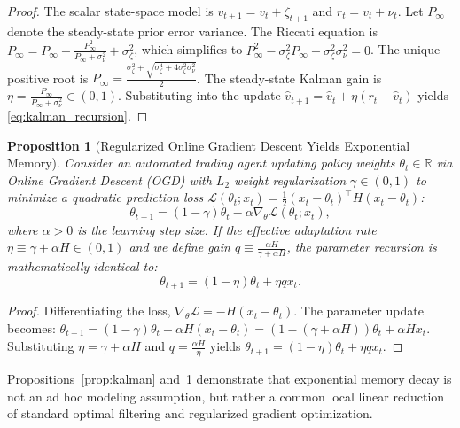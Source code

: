 \documentclass[12pt]{article}
\newtheorem{proposition}[theorem]{Proposition}
\theoremstyle{definition}
\theoremstyle{remark}
\newcommand{\R}{\mathbb{R}}
\begin{document}
\begin{proof}
The scalar state-space model is $v_{t+1} = v_t + \zeta_{t+1}$ and $r_t = v_t + \nu_t$. Let $P_{\infty}$ denote the steady-state prior error variance. The Riccati equation is $P_\infty = P_\infty - \frac{P_\infty^2}{P_\infty + \sigma_\nu^2} + \sigma_\zeta^2$, which simplifies to $P_\infty^2 - \sigma_\zeta^2 P_\infty - \sigma_\zeta^2 \sigma_\nu^2 = 0$. The unique positive root is $P_\infty = \frac{\sigma_\zeta^2 + \sqrt{\sigma_\zeta^4 + 4\sigma_\zeta^2 \sigma_\nu^2}}{2}$. The steady-state Kalman gain is $\eta = \frac{P_\infty}{P_\infty + \sigma_\nu^2} \in (0, 1)$. Substituting into the update $\hat{v}_{t+1} = \hat{v}_t + \eta (r_t - \hat{v}_t)$ yields \eqref{eq:kalman_recursion}.
\end{proof}

\begin{proposition}[Regularized Online Gradient Descent Yields Exponential Memory]
\label{prop:ogd}
Consider an automated trading agent updating policy weights $\theta_t \in \R$ via Online Gradient Descent (OGD) with $L_2$ weight regularization $\gamma \in (0, 1)$ to minimize a quadratic prediction loss $\mathcal{L}(\theta_t; x_t) = \frac{1}{2} (x_t - \theta_t)^\top H (x_t - \theta_t)$:
\begin{equation}
\theta_{t+1} = (1 - \gamma) \theta_t - \alpha \nabla_\theta \mathcal{L}(\theta_t; x_t),
\end{equation}
where $\alpha > 0$ is the learning step size. If the effective adaptation rate $\eta \equiv \gamma + \alpha H \in (0, 1)$ and we define gain $q \equiv \frac{\alpha H}{\gamma + \alpha H}$, the parameter recursion is mathematically identical to:
\begin{equation}
\theta_{t+1} = (1 - \eta) \theta_t + \eta q x_t.
\end{equation}
\end{proposition}

\begin{proof}
Differentiating the loss, $\nabla_\theta \mathcal{L} = -H(x_t - \theta_t)$. The parameter update becomes:
$\theta_{t+1} = (1 - \gamma)\theta_t + \alpha H (x_t - \theta_t) = (1 - (\gamma + \alpha H))\theta_t + \alpha H x_t$.
Substituting $\eta = \gamma + \alpha H$ and $q = \frac{\alpha H}{\eta}$ yields $\theta_{t+1} = (1 - \eta)\theta_t + \eta q x_t$.
\end{proof}

Propositions~\ref{prop:kalman} and~\ref{prop:ogd} demonstrate that exponential memory decay is not an ad hoc modeling assumption, but rather a common local linear reduction of standard optimal filtering and regularized gradient optimization.
\end{document}
